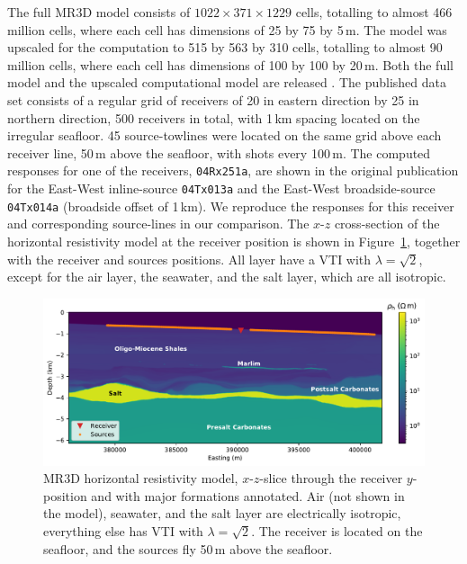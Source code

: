 \documentclass[extra, camera,%
]{gji}
\begin{document}
The full MR3D model consists of $1022 \times 371 \times 1229$ cells, totalling to almost 466 million cells, where each cell has dimensions of 25 by 75 by 5\,m. The model was upscaled for the computation to 515 by 563 by 310 cells, totalling to almost 90 million cells, where each cell has dimensions of 100 by 100 by 20\,m. Both the full model and the upscaled computational model are released . The published data set consists of a regular grid of receivers of 20 in eastern direction by 25 in northern direction, 500 receivers in total, with 1\,km spacing located on the irregular seafloor. 45 source-towlines were located on the same grid above each receiver line, 50\,m above the seafloor, with shots every 100\,m. The computed responses for one of the receivers, \texttt{04Rx251a}, are shown in the original publication for the East-West inline-source \texttt{04Tx013a} and the East-West broadside-source \texttt{04Tx014a} (broadside offset of 1\,km). We reproduce the responses for this receiver and corresponding source-lines in our comparison. The $x$-$z$ cross-section of the horizontal resistivity model at the receiver position is shown in Figure~\ref{fig:model-marlim}, together with the receiver and sources positions. All layer have a VTI with $\lambda=\sqrt{2}$, except for the air layer, the seawater, and the salt layer, which are all isotropic.

%
\begin{figure}
  \centering
  \includegraphics[width=.9\linewidth]{figures/model-marlim}
  \caption{MR3D horizontal resistivity model, $x$-$z$-slice through the receiver $y$-position and with major formations annotated. Air (not shown in the model), seawater, and the salt layer are electrically isotropic, everything else has VTI with $\lambda=\sqrt{2}$. The receiver is located on the seafloor, and the sources fly 50\,m above the seafloor.}
  \label{fig:model-marlim}
\end{figure}
%
\end{document}

